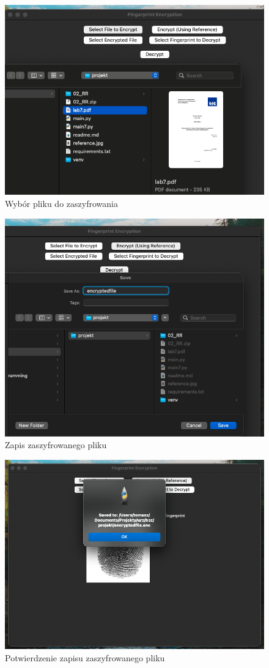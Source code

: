\documentclass{urdpl}     %
\begin{document}
\begin{figure}[H]
	\centering
	\includegraphics[width=0.85\linewidth]{docs/selectFileToEncrypt.png}
	\caption*{Wybór pliku do zaszyfrowania}
\end{figure}

\begin{figure}[H]
	\centering
	\includegraphics[width=0.85\linewidth]{docs/saveEncryptedFile.png}
	\caption*{Zapis zaszyfrowanego pliku}
\end{figure}

\begin{figure}[H]
	\centering
	\includegraphics[width=0.85\linewidth]{docs/savedEncryptedFile.png}
	\caption*{Potwierdzenie zapisu zaszyfrowanego pliku}
\end{figure}
\end{document}
